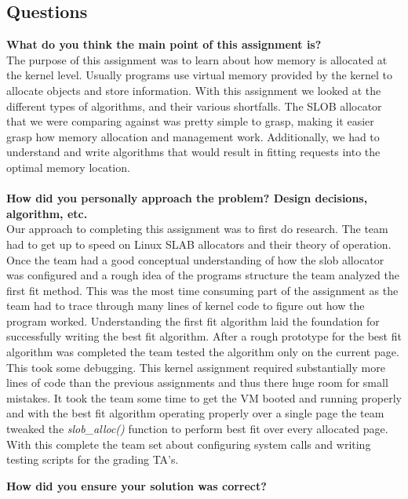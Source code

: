 \documentclass[10pt,onecolumn,draftclsnofoot]{IEEEtran} %
\begin{document}
\begin{singlespace}
\section{\bf Questions}
        \textbf{What do you think the main point of this assignment is?}\\
                \normalfont \indent The purpose of this assignment was to learn about how memory is allocated at the kernel level. Usually programs use virtual memory provided by the kernel to allocate objects and store information.  With this assignment we looked at the different types of algorithms, and their various shortfalls.  The SLOB allocator that we were comparing against was pretty simple to grasp, making it easier grasp how memory allocation and management work. Additionally, we had to understand and write algorithms that would result in fitting requests into the optimal memory location. \\\\
       \textbf{How did you personally approach the problem? Design decisions, algorithm, etc.}\\
	  		\normalfont \indent Our approach to completing this assignment was to first do research. The team had to get up to speed on Linux SLAB allocators and their theory of operation. Once the team had a good conceptual understanding of how the slob allocator was configured and a rough idea of the programs structure the team analyzed the first fit method. This was the most time consuming part of the assignment as the team had to trace through many lines of kernel code to figure out how the program worked. Understanding the first fit algorithm laid the foundation for successfully writing the best fit algorithm. After a rough prototype for the best fit algorithm was completed the team tested the algorithm only on the current page. This took some debugging. This kernel assignment required substantially more lines of code than the previous assignments and thus there huge room for small mistakes. It took the team some time to get the VM booted and running properly and with the best fit algorithm operating properly over a single page the team tweaked the \textit{slob\_alloc()} function to perform best fit over every allocated page. With this complete the team set about configuring system calls and writing testing scripts for the grading TA's.
 
	\textbf{How did you ensure your solution was correct?}\\
                \normalfont \indent 


\end{singlespace}
\end{document}
